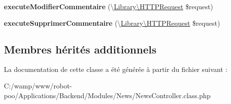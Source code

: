 \begin{DoxyCompactItemize}
\item 
\hypertarget{class_applications_1_1_backend_1_1_modules_1_1_news_1_1_news_controller_a65c7a29dbf9fb2b2271796880b343916}{{\bfseries execute\+Modifier\+Commentaire} (\textbackslash{}\hyperlink{class_library_1_1_h_t_t_p_request}{Library\textbackslash{}\+H\+T\+T\+P\+Request} \$request)}\label{class_applications_1_1_backend_1_1_modules_1_1_news_1_1_news_controller_a65c7a29dbf9fb2b2271796880b343916}

\item 
\hypertarget{class_applications_1_1_backend_1_1_modules_1_1_news_1_1_news_controller_a328dc191fed55ba54049fa1f9667c664}{{\bfseries execute\+Supprimer\+Commentaire} (\textbackslash{}\hyperlink{class_library_1_1_h_t_t_p_request}{Library\textbackslash{}\+H\+T\+T\+P\+Request} \$request)}\label{class_applications_1_1_backend_1_1_modules_1_1_news_1_1_news_controller_a328dc191fed55ba54049fa1f9667c664}

\end{DoxyCompactItemize}
\subsection*{Membres hérités additionnels}


La documentation de cette classe a été générée à partir du fichier suivant \+:\begin{DoxyCompactItemize}
\item 
C\+:/wamp/www/robot-\/poo/\+Applications/\+Backend/\+Modules/\+News/News\+Controller.\+class.\+php\end{DoxyCompactItemize}
